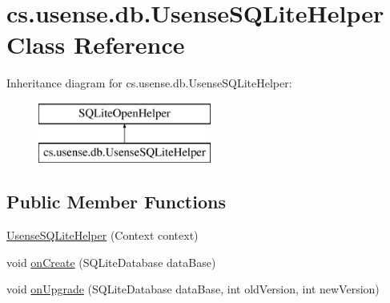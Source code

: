 \hypertarget{classcs_1_1usense_1_1db_1_1_usense_s_q_lite_helper}{}\section{cs.\+usense.\+db.\+Usense\+S\+Q\+Lite\+Helper Class Reference}
\label{classcs_1_1usense_1_1db_1_1_usense_s_q_lite_helper}
Inheritance diagram for cs.\+usense.\+db.\+Usense\+S\+Q\+Lite\+Helper\+:\begin{figure}[H]
\begin{center}
\leavevmode
\includegraphics[height=2.000000cm]{classcs_1_1usense_1_1db_1_1_usense_s_q_lite_helper}
\end{center}
\end{figure}
\subsection*{Public Member Functions}
\begin{DoxyCompactItemize}
\item 
\hyperlink{classcs_1_1usense_1_1db_1_1_usense_s_q_lite_helper_a5e8dc42a618a79c3d3b5a4e0b59c6a9e}{Usense\+S\+Q\+Lite\+Helper} (Context context)
\item 
void \hyperlink{classcs_1_1usense_1_1db_1_1_usense_s_q_lite_helper_a422d7d913426ecdde568deda4d782123}{on\+Create} (S\+Q\+Lite\+Database data\+Base)
\item 
void \hyperlink{classcs_1_1usense_1_1db_1_1_usense_s_q_lite_helper_ad9bd289aa246d88c7ec16fd54886a9b9}{on\+Upgrade} (S\+Q\+Lite\+Database data\+Base, int old\+Version, int new\+Version)
\end{DoxyCompactItemize}
